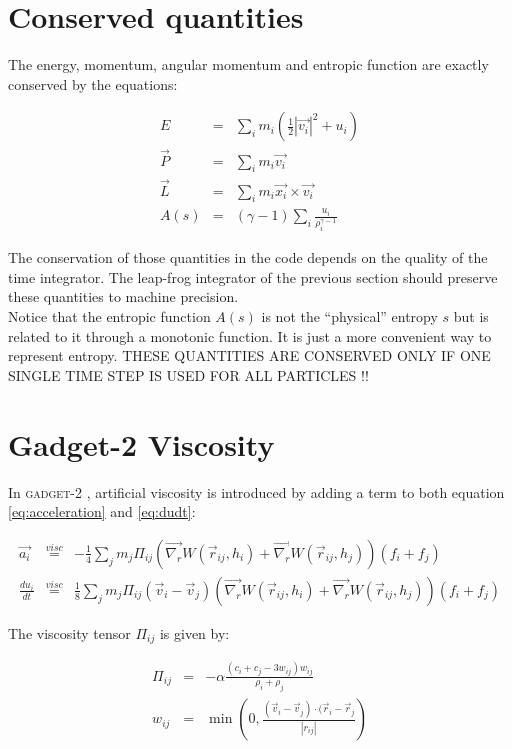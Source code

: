 \documentclass[a4paper,10pt]{report}
\newcommand{\gadget}{\textsc{gadget-2 }}
\begin{document}
\section{Conserved quantities}

The energy, momentum, angular momentum and entropic function are exactly conserved by the equations:

\begin{eqnarray}
E &=&\sum_i m_i\left(\frac{1}{2}|\vec{v_i}|^2+u_i\right)\\
\vec{P} &=&\sum_i m_i \vec{v_i}\\
\vec{L} &=& \sum_i m_i \vec{x_i} \times \vec{v_i}\\ 
A(s) &=& \left(\gamma -1 \right)\sum_i \frac{u_i}{\rho_i^{\gamma - 1}}
\end{eqnarray}

The conservation of those quantities in the code depends on the quality of the time integrator. The leap-frog
integrator of the previous section should preserve these quantities to machine precision.\\
Notice that the entropic function $A(s)$ is not the ``physical'' entropy $s$ but is related to it through a monotonic
function. It is just a more convenient way to represent entropy.
THESE QUANTITIES ARE CONSERVED ONLY IF ONE SINGLE TIME STEP IS USED FOR ALL PARTICLES !!


\section{Gadget-2 Viscosity}

 In \gadget, artificial viscosity is introduced by adding a term to both equation \ref{eq:acceleration} and
\ref{eq:dudt}:

\begin{eqnarray*}
  \vec{a_i} &\stackrel{visc}{=}& -\frac{1}{4}\sum_j m_j \Pi_{ij} \left(\vec{\nabla_r}W(\vec{r}_{ij},
h_i)+\vec{\nabla_r}W(\vec{r}_{ij}, h_j)\right) (f_i+f_j)\\
  \frac{du_i}{dt} &\stackrel{visc}{=}& \frac{1}{8} \sum_j m_j \Pi_{ij}(\vec{v}_i - \vec{v}_j)
\left(\vec{\nabla_r}W(\vec{r}_{ij},
h_i)+\vec{\nabla_r}W(\vec{r}_{ij}, h_j)\right) (f_i+f_j)
\end{eqnarray*}

The viscosity tensor $\Pi_{ij}$ is given by:

\begin{eqnarray*}
 \Pi_{ij} &=& -\alpha \frac{\left(c_i + c_j - 3w_{ij}\right)w_{ij}}{\rho_i + \rho_j} \\
 w_{ij} &=& \min\left(0, \frac{(\vec{v}_i - \vec{v}_j)\cdot(\vec{r}_i - \vec{r}_j}{|r_{ij}|}\right)
\end{eqnarray*}
\end{document}
